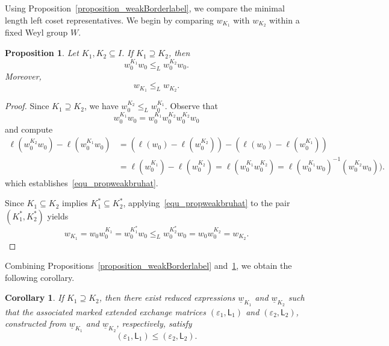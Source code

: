 \documentclass[11pt]{amsart}
\numberwithin{equation}{section}
\theoremstyle{plain}
\newtheorem{proposition}[theorem]{Proposition}
\newtheorem{corollary}[theorem]{Corollary}
\theoremstyle{definition}
\numberwithin{equation}{section}
\begin{document}
Using Proposition~\ref{proposition_weakBorderlabel}, we compare the minimal length {left} coset representatives. We begin by comparing ${w}_{K_1}$ with ${w}_{{K_2}}$ within a fixed Weyl group $W$.

\begin{proposition}\label{proposition_weakbruhat}
Let $K_1, K_2 \subseteq I$.  If $K_1 \supseteq K_2$, then 
\begin{equation}\label{equ_propweakbruhat}
w^{{K_1}}_0 w_0 \leq_L w^{{K_2}}_0 w_0.
\end{equation}
Moreover,
\begin{equation}\label{equ_propweakbruhat2}
w_{K_1} \leq_L  w_{K_2}.
\end{equation}
\end{proposition}

\begin{proof}
Since $K_1 \supseteq K_2$, we have $w_{0}^{K_2} \leq_L w_{0}^{K_1}$. Observe that
$$
w^{{K_1}}_0 w_0 = w^{{K_1}}_0 w^{{K_2}}_0 w^{{K_2}}_0 w_0
$$
and compute
\begin{align*}
\ell ( w^{K_2}_{0} w_0 ) - \ell ( w^{K_1}_{0} w_0) &= \left( \ell(w_0) - \ell (w^{K_2}_{0}) \right) - \left( \ell(w_0) - \ell (w^{K_1}_{0}) \right) \\
&= \ell (w^{K_1}_{0}) - \ell (w^{K_2}_{0}) = \ell (w^{K_1}_{0} w^{K_2}_{0}) = \ell( w^{{K_1}}_0 w_0)^{-1} (w^{{K_2}}_0 w_0)).
\end{align*}
which establishes~\eqref{equ_propweakbruhat}. 

Since $K_1 \subseteq K_2$ implies $K_1^* \subseteq K_2^*$, applying~\eqref{equ_propweakbruhat} to the pair $(K_1^*, K_2^*)$ yields 
$$
w_{K_1} = w_0w_0^{K_1} = w_0^{K_1^*} w_0 \leq_L w_0^{K_2^*} w_0 = w_0 w_0^{K_2} = w_{K_2}.
$$
\end{proof}

Combining Propositions~\ref{proposition_weakBorderlabel} and~\ref{proposition_weakbruhat}, we obtain the following corollary.

\begin{corollary}\label{corollary_Dynkin1}
If $K_1 \supseteq K_2$, then there exist reduced expressions $\underline{w}_{K_1}$ and $\underline{w}_{K_2}$ such that the associated marked extended exchange matrices $(\varepsilon_1, \mathsf{L}_1)$ and $(\varepsilon_2, \mathsf{L}_2)$, constructed from $\underline{w}_{K_1}$ and $\underline{w}_{K_2}$, respectively, satisfy
$$
(\varepsilon_1, \mathsf{L}_1) \leq (\varepsilon_2, \mathsf{L}_2).
$$
\end{corollary}
\end{document}

